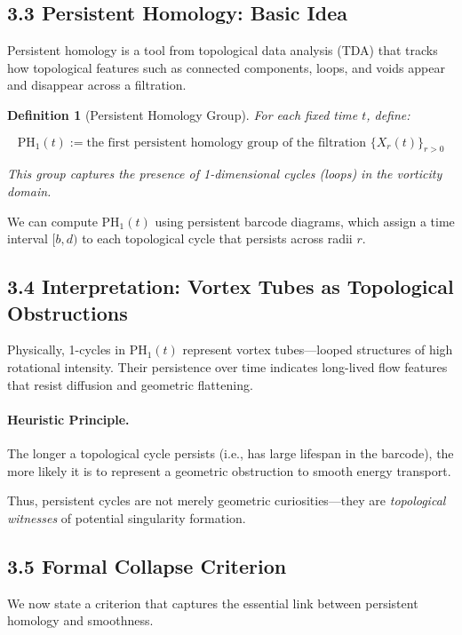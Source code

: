 \documentclass[11pt]{article}
\newtheorem{definition}[theorem]{Definition}
\begin{document}
\subsection{3.3 Persistent Homology: Basic Idea}

Persistent homology is a tool from topological data analysis (TDA) that tracks how topological features such as connected components, loops, and voids appear and disappear across a filtration.

\begin{definition}[Persistent Homology Group]
For each fixed time \( t \), define:

\[
\mathrm{PH}_1(t) := \text{the first persistent homology group of the filtration } \{X_r(t)\}_{r>0}
\]

This group captures the presence of 1-dimensional cycles (loops) in the vorticity domain.
\end{definition}

We can compute \( \mathrm{PH}_1(t) \) using persistent barcode diagrams, which assign a time interval \([b,d)\) to each topological cycle that persists across radii \( r \).

\subsection{3.4 Interpretation: Vortex Tubes as Topological Obstructions}

Physically, 1-cycles in \( \mathrm{PH}_1(t) \) represent vortex tubes—looped structures of high rotational intensity.  
Their persistence over time indicates long-lived flow features that resist diffusion and geometric flattening.

\paragraph{Heuristic Principle.}
The longer a topological cycle persists (i.e., has large lifespan in the barcode), the more likely it is to represent a geometric obstruction to smooth energy transport.

Thus, persistent cycles are not merely geometric curiosities—they are \emph{topological witnesses} of potential singularity formation.

\subsection{3.5 Formal Collapse Criterion}

We now state a criterion that captures the essential link between persistent homology and smoothness.
\end{document}
